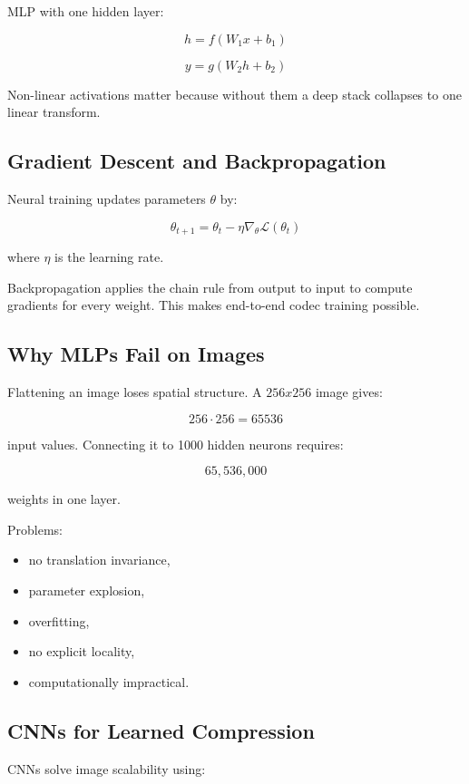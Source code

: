MLP with one hidden layer:

\[
h=f(W_1x+b_1)
\]

\[
y=g(W_2h+b_2)
\]

Non-linear activations matter because without them a deep stack collapses to one linear transform.

\subsection{Gradient Descent and Backpropagation}

Neural training updates parameters $\theta$ by:

\[
\theta_{t+1}=\theta_t-\eta\nabla_\theta\mathcal{L}(\theta_t)
\]

where $\eta$ is the learning rate.

Backpropagation applies the chain rule from output to input to compute gradients for every weight. This makes end-to-end codec training possible.

\subsection{Why MLPs Fail on Images}

Flattening an image loses spatial structure. A $256x256$ image gives:

\[
256\cdot256=65536
\]

input values. Connecting it to 1000 hidden neurons requires:

\[
65,536,000
\]

weights in one layer.

Problems:

\begin{itemize}
  \item no translation invariance,
  \item parameter explosion,
  \item overfitting,
  \item no explicit locality,
  \item computationally impractical.
\end{itemize}

\subsection{CNNs for Learned Compression}

CNNs solve image scalability using:

